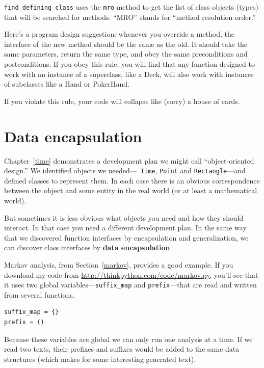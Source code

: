 \documentclass[10pt]{book}
\begin{document}
\verb"find_defining_class" uses the {\tt mro} method to get the list
of class objects (types) that will be searched for methods.  ``MRO''
stands for ``method resolution order.''

Here's a program design suggestion: whenever you override a method,
the interface of the new method should be the same as the old.  It
should take the same parameters, return the same type, and obey the
same preconditions and postconditions.  If you obey this rule, you
will find that any function designed to work with an instance of a
superclass, like a Deck, will also work with instances of subclasses
like a Hand or PokerHand.

If you violate this rule, your code will collapse like (sorry)
a house of cards.


\section{Data encapsulation}

Chapter~\ref{time} demonstrates a development plan we might call
``object-oriented design.''  We identified objects we needed---{\tt
  Time}, {\tt Point} and {\tt Rectangle}---and defined classes to
represent them.  In each case there is an obvious correspondence
between the object and some entity in the real world (or at least a
mathematical world).

But sometimes it is less obvious what objects you need
and how they should interact.  In that case you need a different
development plan.  In the same way that we discovered function
interfaces by encapsulation and generalization, we can discover
class interfaces by {\bf data encapsulation}.

Markov analysis, from Section~\ref{markov}, provides a good example.
If you download my code from \url{http://thinkpython.com/code/markov.py},
you'll see that it uses two global variables---\verb"suffix_map" and
\verb"prefix"---that are read and written from several functions.

\begin{verbatim}
suffix_map = {}
prefix = ()
\end{verbatim}

Because these variables are global
we can only run one analysis
at a time.  If we read two texts, their prefixes and suffixes would
be added to the same data structures (which makes for some interesting
generated text).
\end{document}
